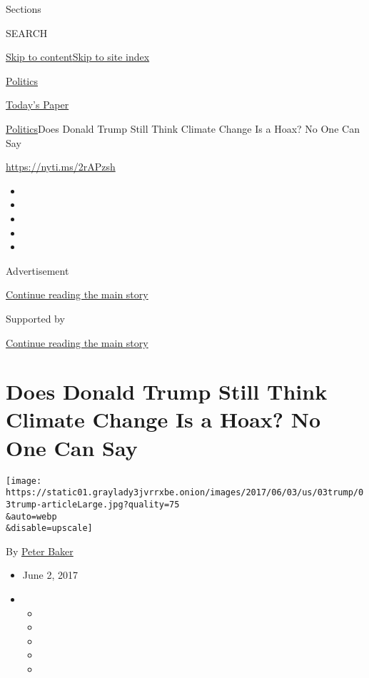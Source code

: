 Sections

SEARCH

\protect\hyperlink{site-content}{Skip to
content}\protect\hyperlink{site-index}{Skip to site index}

\href{https://www.nytimes3xbfgragh.onion/section/politics}{Politics}

\href{https://myaccount.nytimes3xbfgragh.onion/auth/login?response_type=cookie\&client_id=vi}{}

\href{https://www.nytimes3xbfgragh.onion/section/todayspaper}{Today's
Paper}

\href{/section/politics}{Politics}\textbar{}Does Donald Trump Still
Think Climate Change Is a Hoax? No One Can Say

\url{https://nyti.ms/2rAPzsh}

\begin{itemize}
\item
\item
\item
\item
\item
\end{itemize}

Advertisement

\protect\hyperlink{after-top}{Continue reading the main story}

Supported by

\protect\hyperlink{after-sponsor}{Continue reading the main story}

\hypertarget{does-donald-trump-still-think-climate-change-is-a-hoax-no-one-can-say}{%
\section{Does Donald Trump Still Think Climate Change Is a Hoax? No One
Can
Say}\label{does-donald-trump-still-think-climate-change-is-a-hoax-no-one-can-say}}

\texttt{[image: https://static01.graylady3jvrrxbe.onion/images/2017/06/03/us/03trump/03trump-articleLarge.jpg?quality=75\\\&auto=webp\\\&disable=upscale]}

By \href{http://www.nytimes3xbfgragh.onion/by/peter-baker}{Peter Baker}

\begin{itemize}
\item
  June 2, 2017
\item
  \begin{itemize}
  \item
  \item
  \item
  \item
  \item
  \end{itemize}
\end{itemize}

